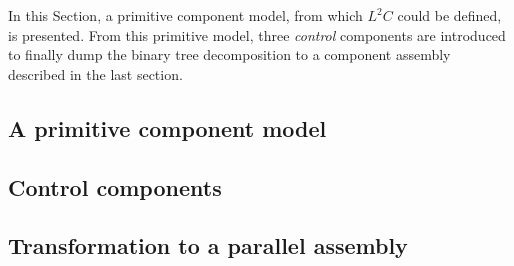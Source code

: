 In this Section, a primitive component model, from which $L^2C$ could be defined, is presented. From this primitive model, three \emph{control} components are introduced to finally dump the binary tree decomposition to a component assembly described in the last section.

\subsection{A primitive component model}

\subsection{Control components}

\subsection{Transformation to a parallel assembly}